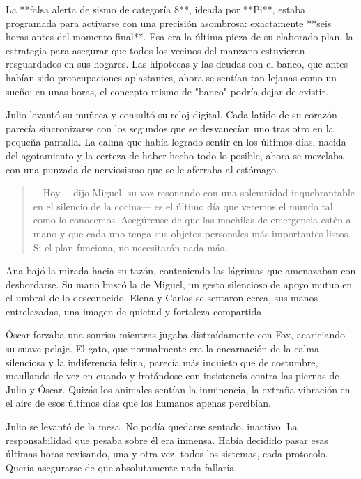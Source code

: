 \documentclass[a4paper,12pt]{book}
\begin{document}
La **falsa alerta de sismo de categoría 8**, ideada por **Pi**, estaba programada para activarse con una precisión asombrosa: exactamente **seis horas antes del momento final**. Esa era la última pieza de su elaborado plan, la estrategia para asegurar que todos los vecinos del manzano estuvieran resguardados en sus hogares. Las hipotecas y las deudas con el banco, que antes habían sido preocupaciones aplastantes, ahora se sentían tan lejanas como un sueño; en unas horas, el concepto mismo de "banco" podría dejar de existir.

Julio levantó su muñeca y consultó su reloj digital. Cada latido de su corazón parecía sincronizarse con los segundos que se desvanecían uno tras otro en la pequeña pantalla. La calma que había logrado sentir en los últimos días, nacida del agotamiento y la certeza de haber hecho todo lo posible, ahora se mezclaba con una punzada de nerviosismo que se le aferraba al estómago.

\begin{quote}
    —Hoy —dijo Miguel, su voz resonando con una solemnidad inquebrantable en el silencio de la cocina— es el último día que veremos el mundo tal como lo conocemos. Asegúrense de que las mochilas de emergencia estén a mano y que cada uno tenga sus objetos personales más importantes listos. Si el plan funciona, no necesitarán nada más.
\end{quote}

Ana bajó la mirada hacia su tazón, conteniendo las lágrimas que amenazaban con desbordarse. Su mano buscó la de Miguel, un gesto silencioso de apoyo mutuo en el umbral de lo desconocido. Elena y Carlos se sentaron cerca, sus manos entrelazadas, una imagen de quietud y fortaleza compartida.

Óscar forzaba una sonrisa mientras jugaba distraídamente con Fox, acariciando su suave pelaje. El gato, que normalmente era la encarnación de la calma silenciosa y la indiferencia felina, parecía más inquieto que de costumbre, maullando de vez en cuando y frotándose con insistencia contra las piernas de Julio y Óscar. Quizás los animales sentían la inminencia, la extraña vibración en el aire de esos últimos días que los humanos apenas percibían.

Julio se levantó de la mesa. No podía quedarse sentado, inactivo. La responsabilidad que pesaba sobre él era inmensa. Había decidido pasar esas últimas horas revisando, una y otra vez, todos los sistemas, cada protocolo. Quería asegurarse de que absolutamente nada fallaría.
\end{document}
